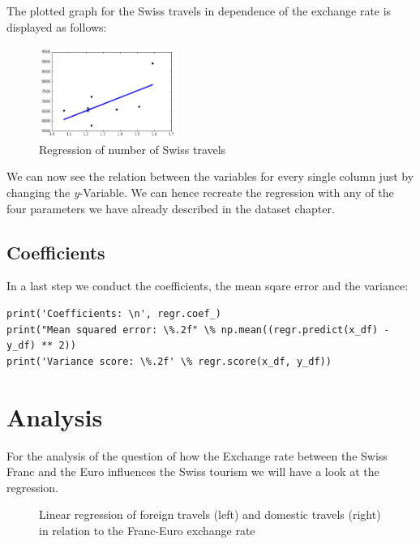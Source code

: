 \documentclass[12pt,a4paper,bibliography=totocnumbered,listof=totocnumbered]{scrartcl}
\begin{document}
The plotted graph for the Swiss travels in dependence of the exchange rate is displayed as follows: 
\begin{figure}[htbp] 
  \centering
     \includegraphics[width=0.4\textwidth]{lr_swiss_travels.png}
  \caption{Regression of number of Swiss travels}
  \label{fig: figure3}
\end{figure}
We can now see the relation between the variables for every single column just by changing the \textit{y}-Variable. We can hence recreate the regression with any of the four parameters we have already described in the dataset chapter. 

\subsection{Coefficients}
In a last step we conduct the coefficients, the mean sqare error and the variance:
\begin{verbatim}
print('Coefficients: \n', regr.coef_)
print("Mean squared error: \%.2f" \% np.mean((regr.predict(x_df) - y_df) ** 2))
print('Variance score: \%.2f' \% regr.score(x_df, y_df))
\end{verbatim}
\section{Analysis}
For the analysis of the question of how the Exchange rate between the Swiss Franc and the Euro influences the Swiss tourism we will have a look at the regression. 


\begin{figure}
\centering
     \qquad
\caption{Linear regression of foreign travels (left) and domestic travels (right) in relation to the Franc-Euro exchange rate}
\end{figure}
\end{document}
